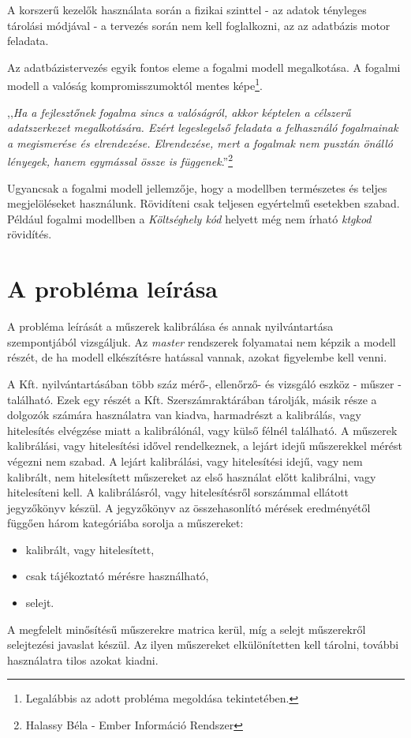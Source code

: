 \documentclass[a4paper,12pt]{report}
\begin{document}
A korszerű kezelők használata során a fizikai szinttel - az adatok tényleges
tárolási módjával - a tervezés során nem kell foglalkozni, az az 
adatbázis motor feladata. 

Az adatbázistervezés egyik fontos eleme a fogalmi modell megalkotása. A fogalmi modell
a valóság kompromisszumoktól mentes képe\footnote{Legalábbis az adott probléma
megoldása tekintetében.}.

,,\textit{Ha a fejlesztőnek fogalma sincs a valóságról, akkor képtelen a célszerű
adatszerkezet megalkotására. Ezért legeslegelső feladata a felhasználó fogalmainak a
megismerése és elrendezése. Elrendezése, mert a fogalmak nem pusztán önálló
lényegek, hanem egymással össze is függenek}.''\footnote{Halassy Béla - Ember
Információ Rendszer}

Ugyancsak a fogalmi modell jellemzője, hogy a modellben természetes és teljes
megjelöléseket használunk. Rövidíteni csak teljesen egyértelmű esetekben szabad.
Például fogalmi modellben a \textit{Költséghely kód} helyett még nem írható \textit{ktgkod}
rövidítés.


\section{A probléma leírása}
A probléma leírását a műszerek kalibrálása és annak nyilvántartása szempontjából
vizsgáljuk. Az \textit{master} rendszerek folyamatai nem képzik a modell 
részét, de ha modell elkészítésre hatással vannak, azokat figyelembe kell venni.

A Kft. nyilvántartásában több száz mérő-, ellenőrző- és vizsgáló eszköz 
- műszer - található. Ezek egy részét a Kft. Szerszámraktárában tárolják, másik 
része a dolgozók számára használatra van kiadva, harmadrészt a kalibrálás, vagy 
hitelesítés elvégzése miatt a kalibrálónál, vagy külső félnél található. 
A műszerek kalibrálási, vagy hitelesítési idővel rendelkeznek, a lejárt idejű 
műszerekkel mérést végezni nem szabad. A lejárt kalibrálási, vagy hitelesítési 
idejű, vagy nem kalibrált, nem hitelesített műszereket az első használat előtt 
kalibrálni, vagy hitelesíteni kell. A kalibrálásról, vagy hitelesítésről 
sorszámmal ellátott jegyzőkönyv készül. A jegyzőkönyv az összehasonlító mérések 
eredményétől függően három kategóriába sorolja a műszereket:
\begin{itemize}
 \item kalibrált, vagy hitelesített,
 \item csak tájékoztató mérésre használható,
 \item selejt.
\end{itemize}
A megfelelt minősítésű műszerekre matrica kerül, míg a selejt műszerekről 
selejtezési javaslat készül. Az ilyen műszereket elkülönítetten kell tárolni, 
további használatra tilos azokat kiadni.
 
\end{document}
